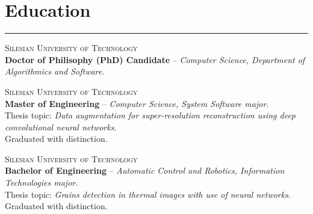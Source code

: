 \documentclass{article}
\begin{document}
\section*{Education}

\hrule \medskip

\noindent
\textsc{Silesian University of Technology} \\
\textbf{Doctor of Philisophy (PhD) Candidate} -- \textit{Computer Science, Department of Algorithmics and Software.}

\medskip
{}
\noindent
\textsc{Silesian University of Technology} \\
\textbf{Master of Engineering} -- \textit{Computer Science, System Software major.} \\
Thesis topic: \textit{Data augmentation for super-resolution reconstruction using deep convolutional neural networks}. \\
Graduated with distinction.

\medskip
{}
\noindent
\textsc{Silesian University of Technology} \\
\textbf{Bachelor of Engineering} -- \textit{Automatic Control and Robotics, Information Technologies major.} \\
Thesis topic: \textit{Grains detection in thermal images with use of neural networks}. \\
Graduated with distinction.

\end{document}
